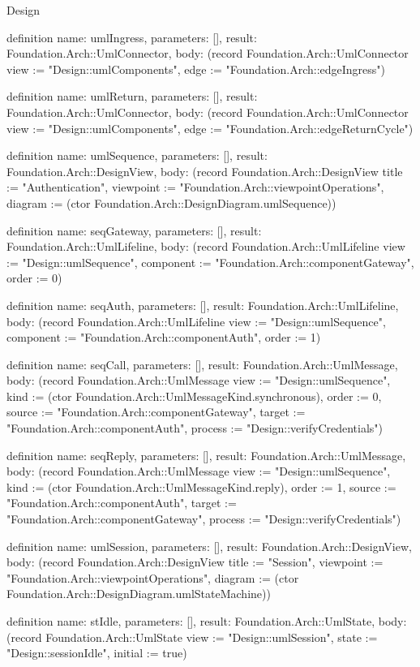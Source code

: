 \begin{lexlean}{Design}
\begin{semanticmodule}
definition{
  name: umlIngress,
  parameters: [],
  result: Foundation.Arch::UmlConnector,
  body: (record Foundation.Arch::UmlConnector {view := "Design::umlComponents", edge := "Foundation.Arch::edgeIngress"})
}

definition{
  name: umlReturn,
  parameters: [],
  result: Foundation.Arch::UmlConnector,
  body: (record Foundation.Arch::UmlConnector {view := "Design::umlComponents", edge := "Foundation.Arch::edgeReturnCycle"})
}

definition{
  name: umlSequence,
  parameters: [],
  result: Foundation.Arch::DesignView,
  body: (record Foundation.Arch::DesignView {title := "Authentication", viewpoint := "Foundation.Arch::viewpointOperations", diagram := (ctor Foundation.Arch::DesignDiagram.umlSequence)})
}

definition{
  name: seqGateway,
  parameters: [],
  result: Foundation.Arch::UmlLifeline,
  body: (record Foundation.Arch::UmlLifeline {view := "Design::umlSequence", component := "Foundation.Arch::componentGateway", order := 0})
}

definition{
  name: seqAuth,
  parameters: [],
  result: Foundation.Arch::UmlLifeline,
  body: (record Foundation.Arch::UmlLifeline {view := "Design::umlSequence", component := "Foundation.Arch::componentAuth", order := 1})
}

definition{
  name: seqCall,
  parameters: [],
  result: Foundation.Arch::UmlMessage,
  body: (record Foundation.Arch::UmlMessage {view := "Design::umlSequence", kind := (ctor Foundation.Arch::UmlMessageKind.synchronous), order := 0, source := "Foundation.Arch::componentGateway", target := "Foundation.Arch::componentAuth", process := "Design::verifyCredentials"})
}

definition{
  name: seqReply,
  parameters: [],
  result: Foundation.Arch::UmlMessage,
  body: (record Foundation.Arch::UmlMessage {view := "Design::umlSequence", kind := (ctor Foundation.Arch::UmlMessageKind.reply), order := 1, source := "Foundation.Arch::componentAuth", target := "Foundation.Arch::componentGateway", process := "Design::verifyCredentials"})
}

definition{
  name: umlSession,
  parameters: [],
  result: Foundation.Arch::DesignView,
  body: (record Foundation.Arch::DesignView {title := "Session", viewpoint := "Foundation.Arch::viewpointOperations", diagram := (ctor Foundation.Arch::DesignDiagram.umlStateMachine)})
}

definition{
  name: stIdle,
  parameters: [],
  result: Foundation.Arch::UmlState,
  body: (record Foundation.Arch::UmlState {view := "Design::umlSession", state := "Design::sessionIdle", initial := true})
}


\end{semanticmodule}
\end{lexlean}
